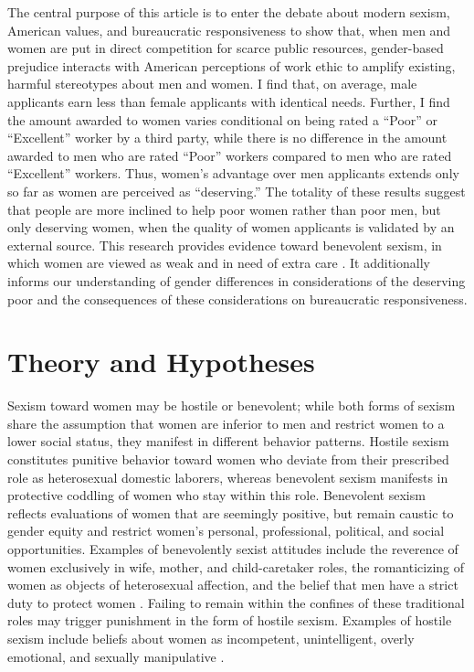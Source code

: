 \documentclass[12pt]{article}%
\begin{document}
\begin{doublespace}
The central purpose of this article is to enter the debate about modern sexism, American values, and bureaucratic responsiveness to show that, when men and women are put in direct competition for scarce public resources, gender-based prejudice interacts with American perceptions of work ethic to amplify existing, harmful stereotypes about men and women. I find that, on average, male applicants earn less than female applicants with identical needs. Further, I find the amount awarded to women varies conditional on being rated a ``Poor” or ``Excellent” worker by a third party, while there is no difference in the amount awarded to men who are rated ``Poor” workers compared to men who are rated ``Excellent” workers. Thus, women’s advantage over men applicants extends only so far as women are perceived as ``deserving.” The totality of these results suggest that people are more inclined to help poor women rather than poor men, but only deserving women, when the quality of women applicants is validated by an external source. This research provides evidence toward benevolent sexism, in which women are viewed as weak and in need of extra care \citep{glick_hostile_1997, glick_ambivalent_2001}. It additionally informs our understanding of gender differences in considerations of the deserving poor and the consequences of these considerations on bureaucratic responsiveness.

\section*{Theory and Hypotheses}

Sexism toward women may be hostile or benevolent; while both forms of sexism share the assumption that women are inferior to men and restrict women to a lower social status, they manifest in different behavior patterns. Hostile sexism constitutes punitive behavior toward women who deviate from their prescribed role as heterosexual domestic laborers, whereas benevolent sexism manifests in protective coddling of women who stay within this role. Benevolent sexism reflects evaluations of women that are seemingly positive, but remain caustic to gender equity and restrict women's personal, professional, political, and social opportunities. Examples of benevolently sexist attitudes include the reverence of women exclusively in wife, mother, and child-caretaker roles, the romanticizing of women as objects of heterosexual affection, and the belief that men have a strict duty to protect women \citep{chen_gender_2020, geus_understanding_2022}. Failing to remain within the confines of these traditional roles may trigger punishment in the form of hostile sexism. Examples of hostile sexism include beliefs about women as incompetent, unintelligent, overly emotional, and sexually manipulative \citep{mcthomas_growing_2016, cassese_playing_2019}.



\end{doublespace}
\end{document}
